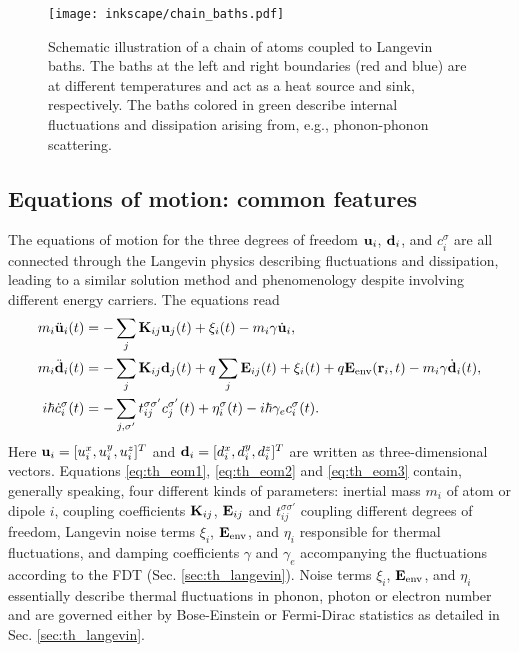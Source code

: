 \begin{figure}
 \begin{center}
 \texttt{[image: inkscape/chain\_baths.pdf]}
 \caption{Schematic illustration of a chain of atoms coupled to Langevin baths. The baths at the left and right boundaries (red and blue) are at different temperatures and act as a heat source and sink, respectively. The baths colored in green describe internal fluctuations and dissipation arising from, e.g., phonon-phonon scattering.}
 \label{fig:langevin_chain}
  \end{center}
\end{figure}

\subsection{Equations of motion: common features}
\label{sec:th_eom}

The equations of motion for the three degrees of freedom $\mathbf{u}_i$, $\mathbf{d}_i$, and $c_i^{\sigma}$ are all connected through the Langevin physics describing fluctuations and dissipation, leading to a similar solution method and phenomenology despite involving different energy carriers. The equations read  \cite{bolsterli70,rosa10,rosa11,dhar03}
\begin{subequations}
\begin{align}
 m_i \ddot{\mathbf{u}}_i(t) &=  - \sum_j \mathbf{K}_{ij}\mathbf{u}_j(t) + \xi_i(t) - m_i \gamma \dot{\mathbf{u}}_i, \label{eq:th_eom1} \\
 m_i \ddot{\mathbf{d}}_i(t) &= - \sum_j \mathbf{K}_{ij} \mathbf{d}_j(t) +q\sum_{j} \mathbf{E}_{ij}(t)+\xi_i(t)+ q\mathbf{E}_{\textrm{env}}(\mathbf{r}_i,t) - m_i \gamma \dot{\mathbf{d}}_i(t), \label{eq:th_eom2}\\
 i\hbar \dot{c}_i^{\sigma}(t) &= -\sum_{j,\sigma'} t_{ij}^{\sigma\sigma'} c_j^{\sigma'}(t) +\eta_i^{\sigma}(t) - i\hbar \gamma_e c_i^{\sigma}(t) \label{eq:th_eom3}.
\end{align}
\end{subequations}
Here $\mathbf{u}_i=[u_i^{x},u_i^y,u_i^z]^T$ and $\mathbf{d}_i=[d_i^x,d_i^y,d_i^z]^T$ are written as three-dimensional vectors. Equations \eqref{eq:th_eom1}, \eqref{eq:th_eom2} and \eqref{eq:th_eom3} contain, generally speaking, four different kinds of parameters: inertial mass $m_i$ of atom or dipole $i$, coupling coefficients $\mathbf{K}_{ij}$, $\mathbf{E}_{ij}$ and $t_{ij}^{\sigma\sigma'}$ coupling different degrees of freedom, Langevin noise terms $\xi_i$, $\mathbf{E}_{\textrm{env}}$, and $\eta_i$ responsible for thermal fluctuations, and damping coefficients $\gamma$ and $\gamma_e$ accompanying the fluctuations according to the FDT (Sec. \ref{sec:th_langevin}). Noise terms $\xi_i$, $\mathbf{E}_{\textrm{env}}$, and $\eta_i$ essentially describe thermal fluctuations in phonon, photon or electron number and are governed either by Bose-Einstein or Fermi-Dirac statistics as detailed in Sec. \ref{sec:th_langevin}. %

